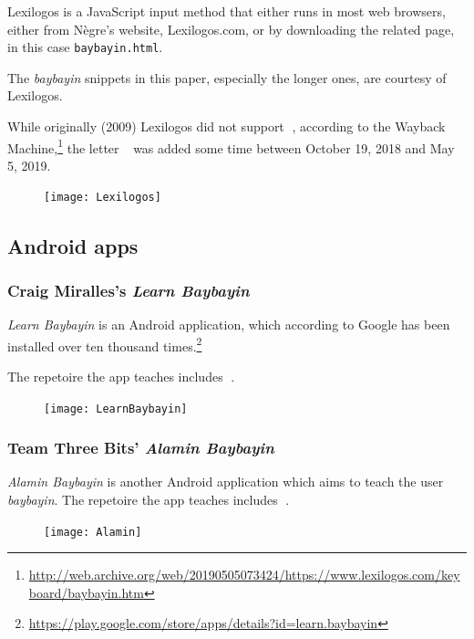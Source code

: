 \documentclass[a4paper,pagesize,openany,14pt,parskip=never]{scrbook}
\newcommand{\≈}{$\approx$}
\newcommand{\ra}{{\baybayin ᜍ}}
\begin{document}
Lexilogos is a JavaScript input method that either runs in most web browsers, either from Nègre's website, Lexilogos.com, or by downloading the related page, in this case \texttt{baybayin.html}.

The {\em baybayin} snippets in this paper, especially the longer ones, are courtesy of Lexilogos.

While originally (2009) Lexilogos did not support \ra, according to the Wayback Machine,\footnote{\url{http://web.archive.org/web/20190505073424/https://www.lexilogos.com/keyboard/baybayin.htm}} the letter \ra\ was added some time between October 19, 2018 and May 5, 2019.

\begin{figure}[H]
\texttt{[image: Lexilogos]}
\end{figure}

\newpage
\subsection{Android apps}
\label{Android}
\subsubsection{Craig Miralles's {\em Learn Baybayin}}

{\em Learn Baybayin} is an Android application, which according to Google has been installed over ten thousand times.\footnote{\url{https://play.google.com/store/apps/details?id=learn.baybayin}}

The repetoire the app teaches includes \ra.

\begin{figure}[H]
\texttt{[image: LearnBaybayin]}
\end{figure}

\subsubsection{Team Three Bits' {\em Alamin Baybayin}}

{\em Alamin Baybayin} is another Android application which aims to teach the user {\em baybayin}. The repetoire the app teaches includes \ra.

\begin{figure}[H]
\texttt{[image: Alamin]}
\end{figure}
\end{document}
